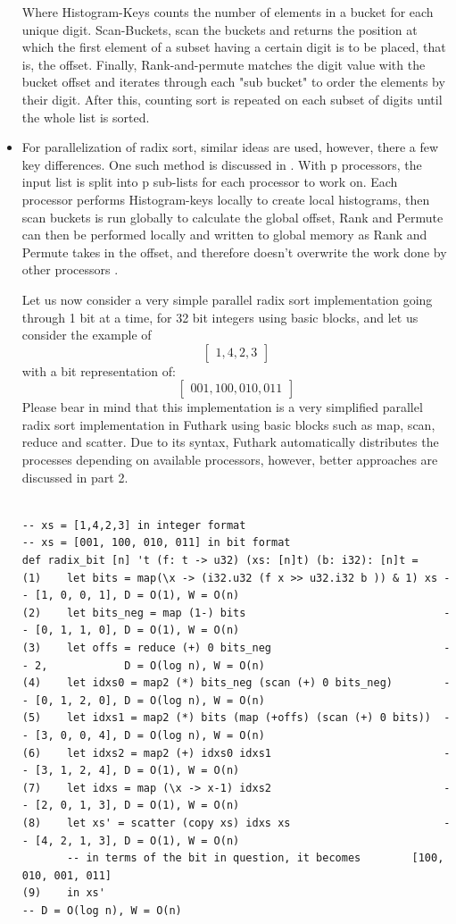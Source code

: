 \documentclass{article}
\begin{document}
\begin{itemize}
Where Histogram-Keys counts the number of elements in a bucket for each unique digit. Scan-Buckets, scan the buckets and returns the position at which the first element of a subset having a certain digit is to be placed, that is, the offset. Finally, Rank-and-permute matches the digit value with the bucket offset and iterates through each "sub bucket" to order the elements by their digit. After this, counting sort is repeated on each subset of digits until the whole list is sorted.  
\item For parallelization of radix sort, similar ideas are used, however, there a few key differences. One such method is discussed in \citep{zagharadixvector}. With p processors, the input list is split into p sub-lists for each processor to work on. Each processor performs Histogram-keys locally to create local histograms, then scan buckets is run globally to calculate the global offset, Rank and Permute can then be performed locally and written to global memory as Rank and Permute takes in the offset, and therefore doesn't overwrite the work done by other processors \citep{zagharadixvector}.

Let us now consider a very simple parallel radix sort implementation going through 1 bit at a time, for 32 bit integers using basic blocks, and let us consider the example of
$$\begin{bmatrix} 1, 4, 2, 3\end{bmatrix}$$
with a bit representation of: 
$$\begin{bmatrix} 001, 100, 010, 011\end{bmatrix}$$
Please bear in mind that this implementation is a very simplified parallel radix sort implementation in Futhark using basic blocks such as map, scan, reduce and scatter. Due to its syntax, Futhark automatically distributes the processes depending on available processors, however, better approaches are discussed in part 2. 
\begin{lstlisting}

-- xs = [1,4,2,3] in integer format
-- xs = [001, 100, 010, 011] in bit format 
def radix_bit [n] 't (f: t -> u32) (xs: [n]t) (b: i32): [n]t =
(1)    let bits = map(\x -> (i32.u32 (f x >> u32.i32 b )) & 1) xs -- [1, 0, 0, 1], D = O(1), W = O(n)
(2)    let bits_neg = map (1-) bits                               -- [0, 1, 1, 0], D = O(1), W = O(n)
(3)    let offs = reduce (+) 0 bits_neg                           -- 2,            D = O(log n), W = O(n)
(4)    let idxs0 = map2 (*) bits_neg (scan (+) 0 bits_neg)        -- [0, 1, 2, 0], D = O(log n), W = O(n)
(5)    let idxs1 = map2 (*) bits (map (+offs) (scan (+) 0 bits))  -- [3, 0, 0, 4], D = O(log n), W = O(n)
(6)    let idxs2 = map2 (+) idxs0 idxs1                           -- [3, 1, 2, 4], D = O(1), W = O(n)
(7)    let idxs = map (\x -> x-1) idxs2                           -- [2, 0, 1, 3], D = O(1), W = O(n)
(8)    let xs' = scatter (copy xs) idxs xs                        -- [4, 2, 1, 3], D = O(1), W = O(n)
       -- in terms of the bit in question, it becomes        [100, 010, 001, 011]
(9)    in xs'                                                                   -- D = O(log n), W = O(n)


\end{lstlisting}
\end{itemize}
\end{document}
